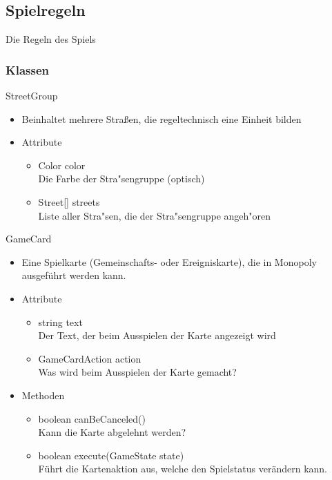 \documentclass[a4paper,10pt]{article}
\begin{document}
\subsection{Spielregeln}


Die Regeln des Spiels

\subsubsection{Klassen}



\item StreetGroup
\begin{itemize}
\item Beinhaltet mehrere Straßen, die regeltechnisch eine Einheit bilden
\item Attribute
\begin{itemize}
\item Color color
\\Die Farbe der Stra"sengruppe (optisch)
\item Street[] streets
\\Liste aller Stra"sen, die der Stra"sengruppe angeh"oren
\end{itemize}
\end{itemize}

\item GameCard
\begin{itemize}
\item Eine Spielkarte (Gemeinschafts- oder Ereigniskarte), die in Monopoly ausgeführt werden kann.
\item Attribute
\begin{itemize}
\item string text
\\Der Text, der beim Ausspielen der Karte angezeigt wird
\item GameCardAction action
\\Was wird beim Ausspielen der Karte gemacht?
\end{itemize}
\item Methoden
\begin{itemize}
\item boolean canBeCanceled()
\\Kann die Karte abgelehnt werden?
\item boolean execute(GameState state)
\\Führt die Kartenaktion aus, welche den Spielstatus verändern kann.
\end{itemize}
\end{itemize}
\end{document}
